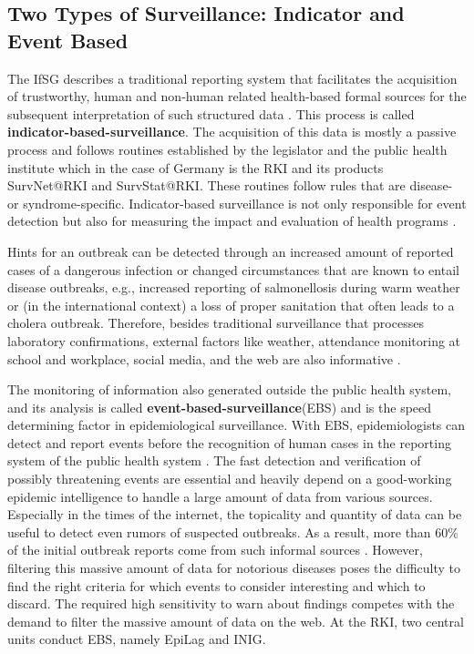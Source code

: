 \subsection{Two Types of Surveillance: Indicator and Event Based}
  The IfSG describes a traditional reporting system that facilitates the acquisition of trustworthy, human and non-human related health-based formal sources for the subsequent interpretation of such structured data \citep{EarlyDetection}.
  This process is called \textbf{indicator-based-surveillance}.
  The acquisition of this data is mostly a passive process and follows routines established by the legislator and the public health institute which in the case of Germany is the RKI and its products SurvNet@RKI and SurvStat@RKI.
  These routines follow rules that are disease- or syndrome-specific.
  Indicator-based surveillance is not only responsible for event detection but also for measuring the impact and evaluation of health programs \citep{EarlyDetection}.

  Hints for an outbreak can be detected through an increased amount of reported cases of a dangerous infection or changed circumstances that are known to entail disease outbreaks, e.g., increased reporting of salmonellosis during warm weather or (in the international context) a loss of proper sanitation that often leads to a cholera outbreak.
  Therefore, besides traditional surveillance that processes laboratory confirmations, external factors like weather, attendance monitoring at school and workplace, social media, and the web are also informative \citep{EarlyDetection}.

  The monitoring of information also generated outside the public health system, and its analysis is called \textbf{event-based-surveillance}(\gls{EBS}) and is the speed determining factor in epidemiological surveillance.
  With EBS, epidemiologists can detect and report events before the recognition of human cases in the reporting system of the public health system \citep{EarlyDetection}.
  The fast detection and verification of possibly threatening events are essential and heavily depend on a good-working epidemic intelligence to handle a large amount of data from various sources.
  Especially in the times of the internet, the topicality and quantity of data can be useful to detect even rumors of suspected outbreaks.
  As a result, more than 60\% of the initial outbreak reports come from such informal sources \citep{EpiSurv}.
  However, filtering this massive amount of data for notorious diseases poses the difficulty to find the right criteria for which events to consider interesting and which to discard.
  The required high sensitivity to warn about findings competes with the demand to filter the massive amount of data on the web.
  At the RKI, two central units conduct EBS, namely EpiLag and INIG.

